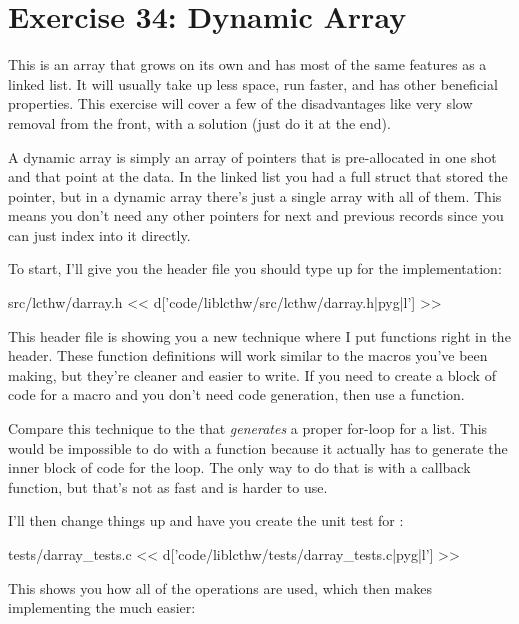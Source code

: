 \chapter{Exercise 34: Dynamic Array}

This is an array that grows on its own and has most of the same features as a
linked list.  It will usually take up less space, run faster, and has other
beneficial properties.  This exercise will cover a few of the disadvantages
like very slow removal from the front, with a solution (just do it at the end).

A dynamic array is simply an array of  pointers that is pre-allocated
in one shot and that point at the data.  In the linked list you had a full struct
that stored the  pointer, but in a dynamic array there's just
a single array with all of them.  This means you don't need any other pointers
for next and previous records since you can just index into it directly.

To start, I'll give you the header file you should type up for the implementation:

\begin{code}{src/lcthw/darray.h}
<< d['code/liblcthw/src/lcthw/darray.h|pyg|l'] >>
\end{code}

This header file is showing you a new technique where I put 
functions right in the header.  These function definitions will work similar to
the  macros you've been making, but they're cleaner and easier to
write.  If you need to create a block of code for a macro and you don't need
code generation, then use a  function.

Compare this technique to the  that \emph{generates} a
proper for-loop for a list. This would be impossible to do with a  function because it actually has to generate the inner block of code for
the loop.  The only way to do that is with a callback function, but that's not
as fast and is harder to use.

I'll then change things up and have you create the unit test for :

\begin{code}{tests/darray\_tests.c}
<< d['code/liblcthw/tests/darray_tests.c|pyg|l'] >>
\end{code}

This shows you how all of the operations are used, which then makes implementing
the  much easier:

